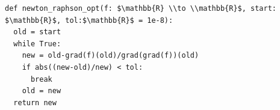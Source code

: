 \documentclass[border=10pt]{standalone}
\begin{document}
\begin{lstlisting}
def newton_raphson_opt(f: $\mathbb{R} \\to \\mathbb{R}$, start: $\mathbb{R}$, tol:$\mathbb{R}$ = 1e-8): 
  old = start
  while True: 
    new = old-grad(f)(old)/grad(grad(f))(old)
    if abs((new-old)/new) < tol:
      break
    old = new
  return new
\end{lstlisting}
\end{document}
